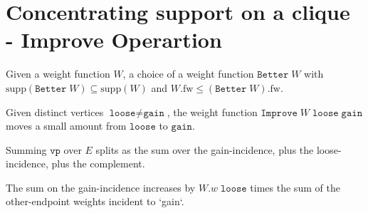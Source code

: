 


\section{Concentrating support on a clique - Improve Operartion}

\begin{definition}
    \label{def:Better}
Given a weight function $W$, a choice of a weight function $\texttt{Better}\;W$ with $\mathrm{supp}(\texttt{Better}\;W)\subseteq\mathrm{supp}(W)$ and $W.\mathrm{fw}\le (\texttt{Better}\;W).\mathrm{fw}$.
\end{definition}

\begin{definition}
    \label{def:Improve}
Given distinct vertices $\texttt{loose}\ne\texttt{gain}$, the weight function $\texttt{Improve}\;W\;\texttt{loose}\;\texttt{gain}$ moves a small amount from $\texttt{loose}$ to $\texttt{gain}$.
\end{definition}

\begin{lemma}
    \label{lem:Improve_partition_sum_split}
Summing \(\texttt{vp}\) over \(E\) splits as the sum over the gain-incidence, plus the loose-incidence, plus the complement.
\end{lemma}

\begin{lemma}
    \label{lem:Improve_gain_contribution_increase}
    The sum on the gain-incidence increases by \(W.w\;\texttt{loose}\) times the sum of the other-endpoint weights incident to `gain`.
\end{lemma}

